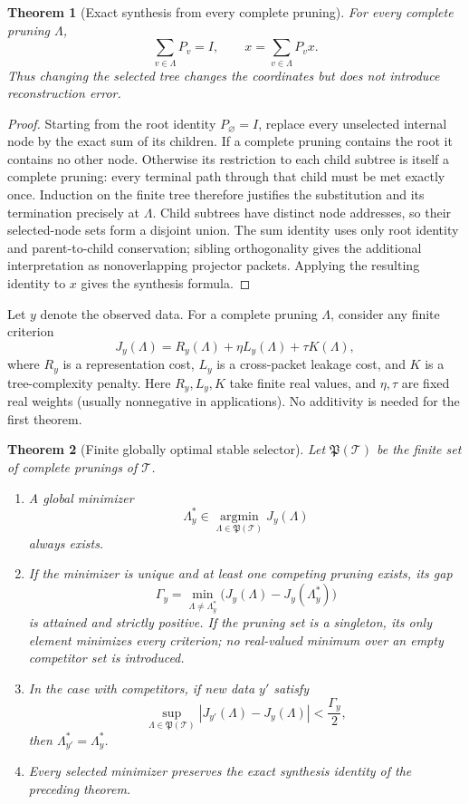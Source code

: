 \documentclass[11pt]{article}
\newtheorem{theorem}{Theorem}[section]
\theoremstyle{definition}
\theoremstyle{remark}
\begin{document}
\begin{theorem}[Exact synthesis from every complete pruning]\label{result:13}
For every complete pruning $\Lambda$,
\[
\boxed{\sum_{v\in\Lambda}P_v=I,}
\qquad
\boxed{x=\sum_{v\in\Lambda}P_vx.}
\]
Thus changing the selected tree changes the coordinates but does not introduce reconstruction error.
\end{theorem}

\begin{proof}
Starting from the root identity $P_{\varnothing}=I$, replace every unselected internal node by the exact sum of its children.  If a complete pruning contains the root it contains no other node. Otherwise its restriction to each child subtree is itself a complete pruning: every terminal path through that child must be met exactly once. Induction on the finite tree therefore justifies the substitution and its termination precisely at $\Lambda$. Child subtrees have distinct node addresses, so their selected-node sets form a disjoint union. The sum identity uses only root identity and parent-to-child conservation; sibling orthogonality gives the additional interpretation as nonoverlapping projector packets.  Applying the resulting identity to $x$ gives the synthesis formula.
\end{proof}

Let $y$ denote the observed data.  For a complete pruning $\Lambda$, consider any finite criterion
\[
J_y(\Lambda)
=
R_y(\Lambda)
+\eta L_y(\Lambda)
+\tau K(\Lambda),
\]
where $R_y$ is a representation cost, $L_y$ is a cross-packet leakage cost, and $K$ is a tree-complexity penalty.  Here $R_y,L_y,K$ take finite real values, and $\eta,\tau$ are fixed real weights (usually nonnegative in applications). No additivity is needed for the first theorem.

\begin{theorem}[Finite globally optimal stable selector]\label{result:14}
Let $\mathfrak P(\mathcal T)$ be the finite set of complete prunings of $\mathcal T$.

\begin{enumerate}[label=(\roman*)]
\item A global minimizer
\[
\Lambda_y^*\in\operatorname*{argmin}_{\Lambda\in\mathfrak P(\mathcal T)}J_y(\Lambda)
\]
always exists.
\item If the minimizer is unique and at least one competing pruning exists, its gap
\[
\Gamma_y
=
\min_{\Lambda\ne\Lambda_y^*}
\bigl(J_y(\Lambda)-J_y(\Lambda_y^*)\bigr)
\]
is attained and strictly positive. If the pruning set is a singleton, its only element minimizes every criterion; no real-valued minimum over an empty competitor set is introduced.
\item In the case with competitors, if new data $y'$ satisfy
\[
\sup_{\Lambda\in\mathfrak P(\mathcal T)}
|J_{y'}(\Lambda)-J_y(\Lambda)|
<\frac{\Gamma_y}{2},
\]
then $\Lambda_{y'}^*=\Lambda_y^*$.
\item Every selected minimizer preserves the exact synthesis identity of the preceding theorem.
\end{enumerate}
\end{theorem}
\end{document}
